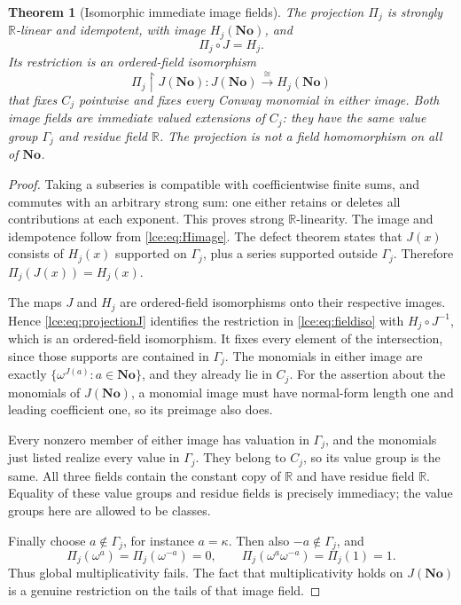 \documentclass[11pt,letterpaper]{article}
\numberwithin{equation}{section}
\newtheorem{theorem}{Theorem}[section]
\theoremstyle{definition}
\theoremstyle{remark}
\newcommand{\No}{\mathbf{No}}
\newcommand{\R}{\mathbb R}
\newcommand{\Gam}{\Gamma_j}
\newcommand{\Common}{C_j}
\newcommand{\res}{\mathbin{\upharpoonright}}
\begin{document}
\begin{theorem}[Isomorphic immediate image fields]\label{lce:thm:projection}
The projection $\Pi_j$ is strongly $\R$-linear and idempotent, with image
$H_j(\No)$, and
\begin{equation}\label{lce:eq:projectionJ}
 \Pi_j\circ J=H_j.
\end{equation}
Its restriction is an ordered-field isomorphism
\begin{equation}\label{lce:eq:fieldiso}
 \Pi_j\res J(\No):J(\No)\xrightarrow{\ \cong\ }H_j(\No)
\end{equation}
that fixes $\Common$ pointwise and fixes every Conway monomial in either
image. Both image fields are immediate valued extensions of $\Common$:
they have the same value group $\Gam$ and residue field $\R$.
The projection is not a field homomorphism on all of $\No$.
\end{theorem}
\begin{proof}
Taking a subseries is compatible with coefficientwise finite sums, and
commutes with an arbitrary strong sum: one either retains or deletes all
contributions at each exponent. This proves strong $\R$-linearity.
The image and idempotence follow from \eqref{lce:eq:Himage}.
The defect theorem states that $J(x)$ consists of $H_j(x)$ supported on
$\Gam$, plus a series supported outside $\Gam$. Therefore
$\Pi_j(J(x))=H_j(x)$.

The maps $J$ and $H_j$ are ordered-field isomorphisms onto their respective
images. Hence \eqref{lce:eq:projectionJ} identifies the restriction in
\eqref{lce:eq:fieldiso} with $H_j\circ J^{-1}$, which is an ordered-field
isomorphism. It fixes every element of the intersection, since those
supports are contained in $\Gam$. The monomials in either image are
exactly $\{\omega^{J(a)}:a\in\No\}$, and they already lie in $\Common$.
For the assertion about the monomials of $J(\No)$, a monomial image must
have normal-form length one and leading coefficient one, so its preimage
also does.

Every nonzero member of either image has valuation in $\Gam$, and the
monomials just listed realize every value in $\Gam$. They belong to
$\Common$, so its value group is the same. All three fields contain the
constant copy of $\R$ and have residue field $\R$. Equality of these
value groups and residue fields is precisely immediacy; the value groups
here are allowed to be classes.

Finally choose $a\notin\Gam$, for instance $a=\kappa$. Then also
$-a\notin\Gam$, and
\[
 \Pi_j(\omega^a)=\Pi_j(\omega^{-a})=0,
 \qquad \Pi_j(\omega^a\omega^{-a})=\Pi_j(1)=1.
\]
Thus global multiplicativity fails. The fact that multiplicativity holds
on $J(\No)$ is a genuine restriction on the tails of that image field.
\end{proof}
\end{document}
